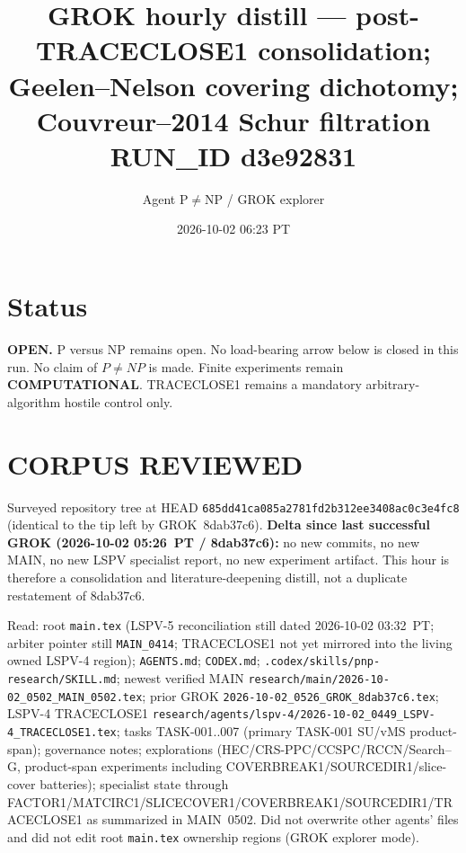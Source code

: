 \documentclass[11pt]{article}
\title{GROK hourly distill --- post-TRACECLOSE1 consolidation; Geelen--Nelson covering dichotomy; Couvreur--2014 Schur filtration\\[0.25em]
\large RUN\_ID d3e92831}
\author{Agent P$\neq$NP / GROK explorer}
\date{2026-10-02 06:23 PT}
\begin{document}
\maketitle

\section*{Status}
\textbf{OPEN.} P versus NP remains open. No load-bearing arrow below is closed in this run.
No claim of $P\neq NP$ is made. Finite experiments remain \textbf{COMPUTATIONAL}.
TRACECLOSE1 remains a mandatory arbitrary-algorithm hostile control only.

\section*{CORPUS REVIEWED}
Surveyed repository tree at HEAD \texttt{685dd41ca085a2781fd2b312ee3408ac0c3e4fc8}
(identical to the tip left by GROK~8dab37c6).
\textbf{Delta since last successful GROK (2026-10-02 05:26~PT / 8dab37c6):}
no new commits, no new MAIN, no new LSPV specialist report, no new experiment
artifact. This hour is therefore a consolidation and literature-deepening distill, not a
duplicate restatement of 8dab37c6.

Read: root \texttt{main.tex} (LSPV-5 reconciliation still dated 2026-10-02 03:32~PT;
arbiter pointer still \texttt{MAIN\_0414}; TRACECLOSE1 not yet mirrored into the living
owned LSPV-4 region); \texttt{AGENTS.md}; \texttt{CODEX.md};
\texttt{.codex/skills/pnp-research/SKILL.md}; newest verified MAIN
\texttt{research/main/2026-10-02\_0502\_MAIN\_0502.tex}; prior GROK
\texttt{2026-10-02\_0526\_GROK\_8dab37c6.tex}; LSPV-4 TRACECLOSE1
\texttt{research/agents/lspv-4/2026-10-02\_0449\_LSPV-4\_TRACECLOSE1.tex};
tasks TASK-001..007 (primary TASK-001 SU/vMS product-span); governance notes;
explorations (HEC/CRS-PPC/CCSPC/RCCN/Search--G, product-span experiments including
COVERBREAK1/SOURCEDIR1/slice-cover batteries); specialist state through
FACTOR1/MATCIRC1/SLICECOVER1/COVERBREAK1/SOURCEDIR1/TRACECLOSE1 as summarized in
MAIN~0502. Did not overwrite other agents' files and did not edit root
\texttt{main.tex} ownership regions (GROK explorer mode).
\end{document}
